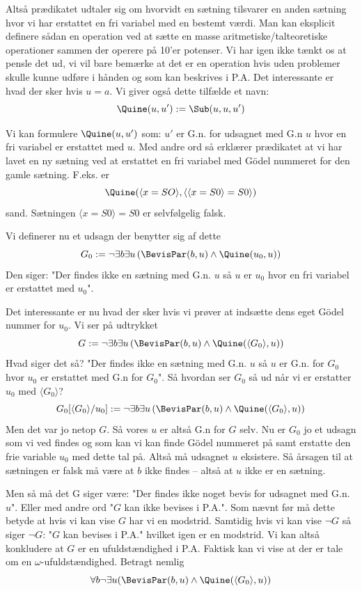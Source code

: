 Altså prædikatet udtaler sig om hvorvidt en sætning tilsvarer en anden sætning hvor vi har erstattet en fri variabel med en bestemt værdi.
Man kan eksplicit definere sådan en operation ved at sætte en masse aritmetiske/talteoretiske operationer sammen der operere på 10'er potenser.
Vi har igen ikke tænkt os at pensle det ud, vi vil bare bemærke at det er en operation hvis uden problemer skulle kunne udføre
i hånden og som kan beskrives i P.A. Det interessante er hvad der sker hvis $u=a$.
Vi giver også dette tilfælde et navn:
\[
	\Quine(u,u') := \Sub(u,u,u')
\]

Vi kan formulere $\Quine(u,u')$ som: $u'$ er G.n. for udsagnet med G.n $u$ hvor en fri variabel er erstattet med $u$. Med andre ord så erklærer prædikatet at vi har lavet en ny sætning ved at erstattet en fri variabel med Gödel nummeret for den gamle sætning. F.eks. er
\[
	\Quine(\langle x=SO \rangle, \langle\langle x=S0\rangle=S0\rangle)
\]
sand. Sætningen $\langle x=S0 \rangle = S0$ er selvfølgelig falsk.

Vi definerer nu et udsagn der benytter sig af dette
\[
	G_0 := \neg\exists b \exists u \left( \BevisPar(b,u) \land \Quine(u_0,u) \right)
\]
Den siger: "Der findes ikke en sætning med G.n. $u$ så $u$ er $u_0$ hvor en fri variabel er erstattet med $u_0$".

Det interessante er nu hvad der sker hvis vi prøver at indsætte dens eget Gödel nummer for $u_0$.
Vi ser på udtrykket
\[
	G := \neg\exists b \exists u \left( \BevisPar(b,u) \land \Quine(\langle G_0 \rangle,u) \right)
\]
Hvad siger det så? "Der findes ikke en sætning med G.n. $u$ så $u$ er G.n. for $G_0$ hvor
$u_0$ er erstattet med G.n for $G_0$". Så hvordan ser $G_0$ så ud når vi er erstatter $u_0$ med $\langle G_0 \rangle$?
\[
	G_0[\langle G_0 \rangle/u_0] := \neg\exists b \exists u \left( \BevisPar(b,u) \land \Quine(\langle G_0 \rangle,u) \right)
\]
Men det var jo netop $G$. Så vores $u$ er altså G.n for $G$ selv. Nu er $G_0$ jo et udsagn som vi ved findes og som kan
vi kan finde Gödel nummeret på samt erstatte den frie variable $u_0$ med dette tal på.
Altså må udsagnet $u$ eksistere. Så årsagen til at sætningen er falsk må være at $b$ ikke findes -- altså at $u$ ikke er en sætning.

Men så må det G siger være: "Der findes ikke noget bevis for udsagnet med G.n. $u$".
Eller med andre ord "$G$ kan ikke bevises i P.A.". Som nævnt før må dette betyde at hvis vi kan vise $G$ har vi en modstrid.
Samtidig hvis vi kan vise $\neg G$ så siger $\neg G$: "$G$ kan bevises i P.A." hvilket igen er en modstrid.
Vi kan altså konkludere at $G$ er en ufuldstændighed i P.A. Faktisk kan vi vise at der er tale om en $\omega$-ufuldstændighed.
Betragt nemlig
\[
	\forall b \neg \exists u (\BevisPar(b,u) \land \Quine(\langle G_0 \rangle, u))
\]

